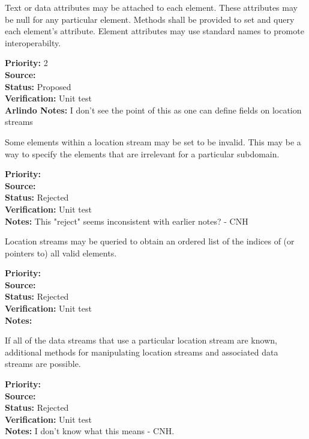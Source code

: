 Text or data attributes may be attached to each element.  These
attributes may be null for any particular element.  Methods shall be provided to set
and query each element's attribute.  Element attributes may use standard names to
promote interoperabilty.
\begin{reqlist}
{\bf Priority:} 2 \\
{\bf Source:} \\
{\bf Status:} Proposed \\
{\bf Verification:} Unit test \\
{\bf Arlindo Notes:} I don't see the point of this as one can define fields on location streams 
\end{reqlist}


Some elements within a location stream may be set to be invalid.  This may be a way
to specify the elements that are irrelevant for a particular subdomain.

\begin{reqlist}
{\bf Priority:} \\
{\bf Source:} \\
{\bf Status:} Rejected \\
{\bf Verification:} Unit test \\
{\bf Notes:} This "reject" seems inconsistent with earlier notes? - CNH
\end{reqlist}


Location streams may be queried to obtain an ordered list of the indices of (or
pointers to) all valid elements.

\begin{reqlist}
{\bf Priority:} \\
{\bf Source:} \\
{\bf Status:} Rejected \\
{\bf Verification:} Unit test \\
{\bf Notes:} 
\end{reqlist}

If all of the data streams that use a particular location stream are known,
additional methods for manipulating location streams and associated data streams are
possible.
\begin{reqlist}
{\bf Priority:} \\
{\bf Source:} \\
{\bf Status:} Rejected \\
{\bf Verification:} Unit test \\
{\bf Notes:} I don't know what this means - CNH.
\end{reqlist}

